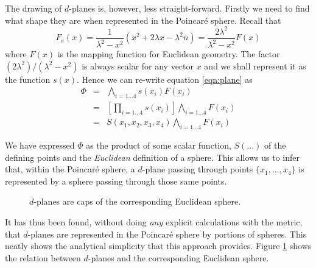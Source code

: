 The drawing of $d$-planes is, however, less straight-forward. Firstly we
need to find what shape they are when represented in the Poincar\'e sphere.
Recall that
\[
F_e(x) = \frac{1}{\lambda^2 - x^2} (x^2 + 2\lambda x - \lambda^2\bar{n})
 =  \frac{2\lambda^2}{\lambda^2 - x^2} F(x)
\]
where $F(x)$ is the mapping function for Euclidean geometry. The factor
$(2\lambda^2) / (\lambda^2 - x^2)$ is always scalar for any vector
$x$ and we shall represent it as the function $s(x)$. Hence we can
re-write equation \ref{eqn:plane} as
\begin{eqnarray}
\Phi & = & \bigwedge_{i = 1...4} s(x_i)F(x_i) \\
     & = & \left[\prod_{i = 1...4} s(x_i)\right] \bigwedge_{i = 1...4} F(x_i) \\
     & = & S(x_1, x_2, x_3, x_4) \bigwedge_{i = 1...4} F(x_i) 
\end{eqnarray}

We have expressed $\Phi$ as the product of some scalar function, $S(...)$
of the defining points and the \emph{Euclidean} definition of a sphere. This
allows us to infer that, within the Poincar\'e sphere, a $d$-plane passing
through points $\{x_1, ..., x_4\}$ is represented by a sphere passing
through those same points.

\begin{figure} \centering
{}
\caption{$d$-planes are caps of the corresponding Euclidean sphere.}
\label{fig:dplane}
\end{figure}

It has thus been found, without doing \emph{any} explicit calculations with
the metric, that
$d$-planes are represented in the Poincar\'e sphere by portions of spheres.
This neatly shows the analytical simplicity that this approach provides.
Figure \ref{fig:dplane} shows the
relation between $d$-planes and the corresponding Euclidean sphere.


